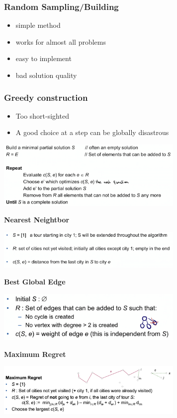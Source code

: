 \documentclass[10pt,a4paper,twocolumn]{article}
\newcommand\pro{\item[$+$]}
\newcommand\con{\item[$-$]}
\begin{document}
\subsubsection{Random Sampling/Building}

\begin{itemize}
	\pro simple method
	\pro works for almost all problems
	\pro easy to implement
	\con bad solution quality
\end{itemize}

\subsubsection{Greedy construction}

\begin{itemize}
	\con Too short-sighted
	\con A good choice at a step can be globally disastrous 
\end{itemize}

\begin{center}
\includegraphics[width=9cm]{images/creedy-construction}
\end{center}

\textbf{Nearest Neightbor}
\begin{center}
\includegraphics[width=9cm]{images/nearest-neighbor}
\end{center}

\textbf{Best Global Edge}
\begin{center}
\includegraphics[width=9cm]{images/best-global-edge}
\end{center}

\newpage
\textbf{Maximum Regret}
\begin{center}
\includegraphics[width=9cm]{images/maximum-regret}
\end{center}
\end{document}
